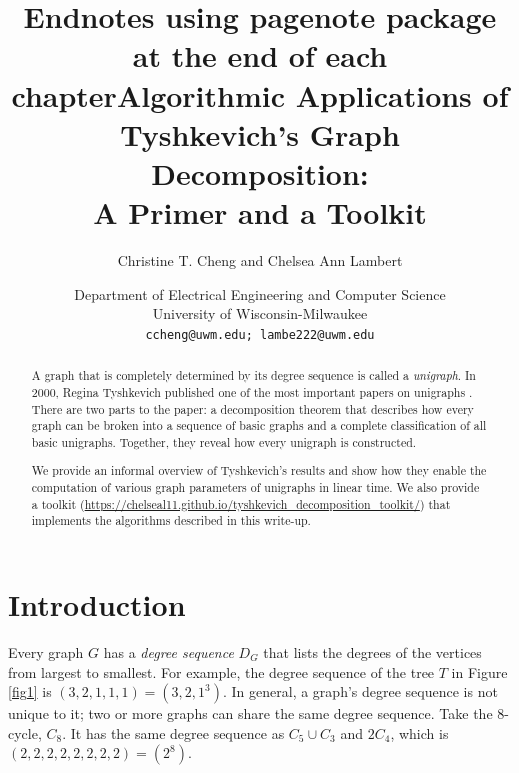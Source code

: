 \documentclass[11pt]{article}
\title{Endnotes using pagenote package at the end of each chapter}
\title{Algorithmic Applications of Tyshkevich's Graph Decomposition: \\ A Primer and a Toolkit}
\author{Christine T. Cheng and Chelsea Ann Lambert}%
\date{Department of Electrical Engineering and Computer Science \\ University of Wisconsin-Milwaukee\\ {\tt ccheng@uwm.edu; lambe222@uwm.edu}%
       }
\begin{document}
\maketitle

\begin{abstract}
A graph that is completely determined by its degree sequence is called a {\it unigraph}.  In 2000, Regina Tyshkevich published one of the most important papers on unigraphs \cite{Ty00}.  There are two parts to the paper: a decomposition theorem that describes how every graph can be broken into a sequence of basic graphs and  a complete classification of all  basic unigraphs. Together, they reveal how every unigraph is constructed. 

We provide an informal overview of Tyshkevich's  results and show how they enable the computation of  various graph parameters of unigraphs in linear time.  We also provide a toolkit (\url{https://chelseal11.github.io/tyshkevich_decomposition_toolkit/}) that implements  the algorithms described in this write-up.





\end{abstract}

\section{Introduction}
  
	
	Every graph $G$ has a {\it degree sequence} $D_G$ that lists  the degrees of the vertices from largest to smallest.  For example,  the degree sequence of the tree $T$ in Figure \ref{fig1} is $(3,2,1,1,1) = (3,2,1^3)$.   
In general,  a graph's degree sequence is not unique to it;  two or more graphs can share the same degree sequence.  
Take the $8$-cycle, $C_8$.  It has the same degree sequence as $C_5 \cup C_3$ and $2C_4$,  which is $(2,2,2,2,2, 2, 2, 2) = (2^8)$.    
\end{document}
